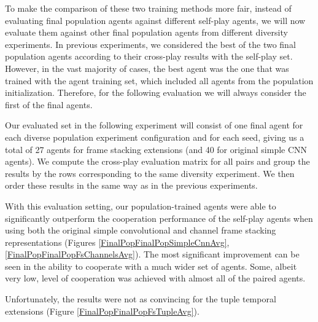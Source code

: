 To make the comparison of these two training methods more fair, instead of evaluating final population agents against different self-play agents, we will now evaluate them against other final population agents from different diversity experiments.
In previous experiments, we considered the best of the two final population agents according to their cross-play results with the self-play set.
However, in the vast majority of cases, the best agent was the one that was trained with the agent training set, which included all agents from the population initialization.
Therefore, for the following evaluation we will always consider the first of the final agents.

Our evaluated set in the following experiment will consist of one final agent for each diverse population experiment configuration and for each seed, giving us a total of 27 agents for frame stacking extensions (and 40 for original simple CNN agents).
We compute the cross-play evaluation matrix for all pairs and group the results by the rows corresponding to the same diversity experiment. 
We then order these results in the same way as in the previous experiments.

With this evaluation setting, our population-trained agents were able to significantly outperform the cooperation performance of the self-play agents when using both the original simple convolutional and channel frame stacking representations (Figures \ref{FinalPopFinalPopSimpleCnnAvg}, \ref{FinalPopFinalPopFsChannelsAvg}).
The most significant improvement can be seen in the ability to cooperate with a much wider set of agents.
Some, albeit very low, level of cooperation was achieved with almost all of the paired agents.

Unfortunately, the results were not as convincing for the tuple temporal extensions (Figure \ref{FinalPopFinalPopFsTupleAvg}).


